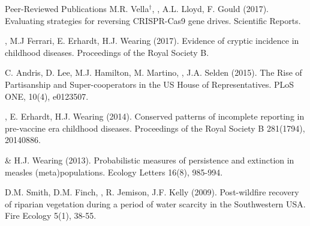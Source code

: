 \documentclass{resume} %
\begin{document}
\begin{rSection}{Peer-Reviewed Publications}
M.R. Vella$^\dagger$, \authSelf, A.L. Lloyd, F. Gould (2017).
Evaluating strategies for reversing CRISPR-Cas9 gene drives.
Scientific Reports.

\authSelf, M.J Ferrari, E. Erhardt, H.J. Wearing (2017).
Evidence of cryptic incidence in childhood diseases. 
Proceedings of the Royal Society B.

C. Andris, D. Lee, M.J.  Hamilton, M. Martino, \authSelf,  J.A. Selden (2015).
The Rise of Partisanship and Super-cooperators in the US House of Representatives.
PLoS ONE, 10(4), e0123507.

\authSelf, E. Erhardt, H.J. Wearing (2014). 
Conserved patterns of incomplete reporting in pre-vaccine era childhood diseases.
Proceedings of the Royal Society B 281(1794), 20140886. 

\authSelf \& H.J. Wearing (2013). Probabilistic measures of persistence
and extinction in measles (meta)populations. Ecology Letters 16(8), 985-994.

D.M. Smith, D.M. Finch, \authSelf, R. Jemison, J.F. Kelly (2009). Post-wildfire recovery of riparian vegetation during a period of water scarcity in the Southwestern USA. Fire Ecology 5(1), 38-55.
\end{rSection}
\end{document}

